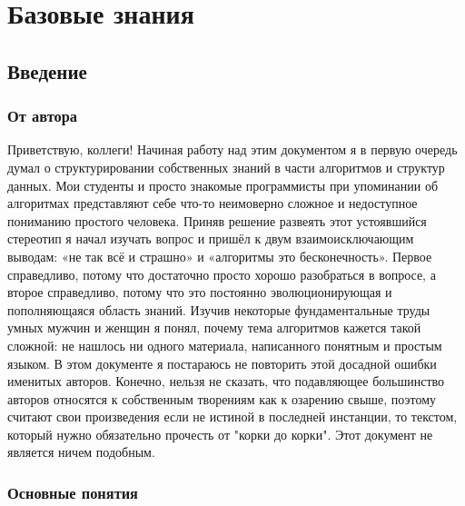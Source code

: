 \documentclass[fontsize=14bp]{report}
\begin{document}
\maketitle
\newpage
\thispagestyle{empty}
\tableofcontents
\newpage

\chapter{Базовые знания}
\section{Введение}
\subsection*{От автора}
Приветствую, коллеги! Начиная работу над этим документом я в первую очередь думал о структурировании собственных знаний в части алгоритмов и структур данных. Мои студенты и просто знакомые программисты при упоминании об алгоритмах представляют себе что-то неимоверно сложное и недоступное пониманию простого человека. Приняв решение развеять этот устоявшийся стереотип я начал изучать вопрос и пришёл к двум взаимоисключающим выводам: «не так всё и страшно» и «алгоритмы это бесконечность». Первое справедливо, потому что достаточно просто хорошо разобраться в вопросе, а второе справедливо, потому что это постоянно эволюционирующая и пополняющаяся область знаний. Изучив некоторые фундаментальные труды умных мужчин и женщин я понял, почему тема алгоритмов кажется такой сложной: не нашлось ни одного материала, написанного понятным и простым языком. В этом документе я постараюсь не повторить этой досадной ошибки именитых авторов. Конечно, нельзя не сказать, что подавляющее большинство авторов относятся к собственным творениям как к озарению свыше, поэтому считают свои произведения если не истиной в последней инстанции, то текстом, который нужно обязательно прочесть от "корки до корки". Этот документ не является ничем подобным.
\subsection{Основные понятия}
\end{document}
